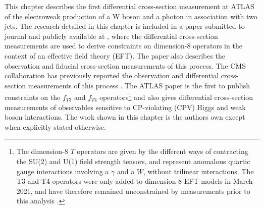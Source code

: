 This chapter describes the first differential cross-section measurement at ATLAS of the electroweak production of a W boson and a photon in association with two jets. The research detailed in this chapter is included in a paper submitted to journal and publicly available at \cite{VBSWy:VBSWy}, where the differential cross-section measurements are used to derive constraints on dimension-8 operators in the context of an effective field theory (EFT). The paper also describes the observation and fiducial cross-section measurements of this process. The CMS collaboration has previously reported the observation \cite{VBSWy:CMSVBSWy} and differential cross-section measurements of this process \cite{VBSWy:CMSdiffx}. The ATLAS paper is the first to publish constraints on the $f_{T3}$ and $f_{T4}$ operators\footnote{The dimension-8 $T$ operators are given by the different ways of contracting the SU(2) and U(1) field strength tensors, and represent anomalous quartic gauge interactions involving a $\gamma$ and a $W$, without trilinear interactions. The T3 and T4 operators were only added to dimension-8 EFT models in March 2021, and have therefore remained unconstrained by measurements prior to this analysis \cite{TtypeOperators}.} and also gives differential cross-section measurements of observables sensitive to CP-violating (CPV) Higgs and weak boson interactions. The work shown in this chapter is the authors own except when explicitly stated otherwise.


